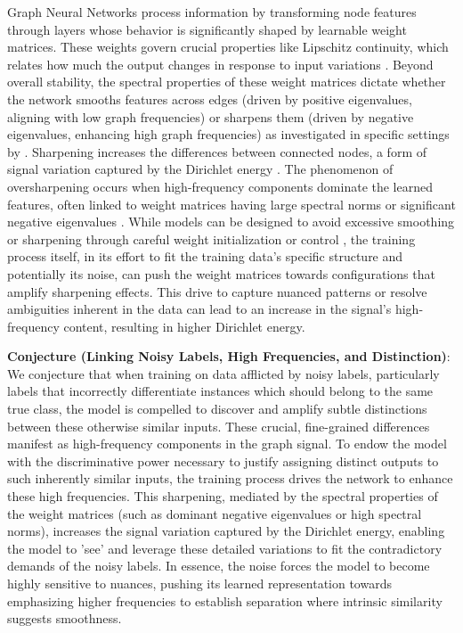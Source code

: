 \documentclass[11pt]{article}\usepackage{amsmath,amssymb,amsthm,bbm}
\newcommand{\1}{\mathbbm{1}}
\begin{document}
\title{}
\author{}
\date{\today}

%




Graph Neural Networks process information by transforming node features through layers whose behavior is significantly shaped by learnable weight matrices. These weights govern crucial properties like Lipschitz continuity, which relates how much the output changes in response to input variations \citep{chuang2022tree, davidson2024h, juvina2024training, gama2020stability}. Beyond overall stability, the spectral properties of these weight matrices dictate whether the network smooths features across edges (driven by positive eigenvalues, aligning with low graph frequencies) or sharpens them (driven by negative eigenvalues, enhancing high graph frequencies) as investigated in specific settings by \cite{GRAFF}. Sharpening increases the differences between connected nodes, a form of signal variation captured by the Dirichlet energy \citep{zhou2021dirichlet}. The phenomenon of oversharpening occurs when high-frequency components dominate the learned features, often linked to weight matrices having large spectral norms or significant negative eigenvalues \cite{GRAFF}. While models can be designed to avoid excessive smoothing or sharpening through careful weight initialization or control \citep{zhuo2024graph}, the training process itself, in its effort to fit the training data's specific structure and potentially its noise, can push the weight matrices towards configurations that amplify sharpening effects. This drive to capture nuanced patterns or resolve ambiguities inherent in the data can lead to an increase in the signal's high-frequency content, resulting in higher Dirichlet energy.

\textbf{Conjecture (Linking Noisy Labels, High Frequencies, and Distinction)}:
We conjecture that when training on data afflicted by noisy labels, particularly labels that incorrectly differentiate instances which should belong to the same true class, the model is compelled to discover and amplify subtle distinctions between these otherwise similar inputs. These crucial, fine-grained differences manifest as high-frequency components in the graph signal. To endow the model with the discriminative power necessary to justify assigning distinct outputs to such inherently similar inputs, the training process drives the network to enhance these high frequencies. This sharpening, mediated by the spectral properties of the weight matrices (such as dominant negative eigenvalues or high spectral norms), increases the signal variation captured by the Dirichlet energy, enabling the model to 'see' and leverage these detailed variations to fit the contradictory demands of the noisy labels. In essence, the noise forces the model to become highly sensitive to nuances, pushing its learned representation towards emphasizing higher frequencies to establish separation where intrinsic similarity suggests smoothness.
\end{document}
